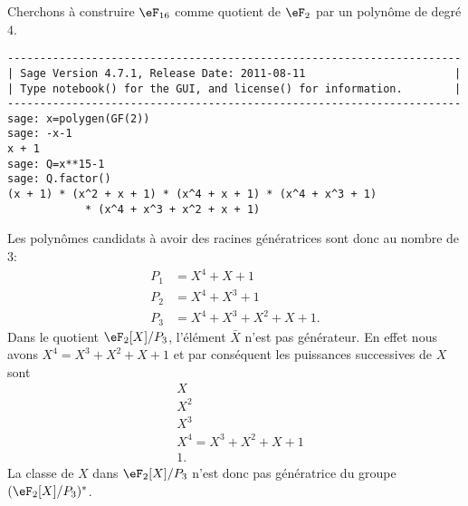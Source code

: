 \begin{example}     \label{ExemWUdrcs}
	Cherchons à construire \( \eF_{16}\) comme quotient de \( \eF_2\) par un polynôme de degré \( 4\).
	\begin{verbatim}
----------------------------------------------------------------------
| Sage Version 4.7.1, Release Date: 2011-08-11                       |
| Type notebook() for the GUI, and license() for information.        |
----------------------------------------------------------------------
sage: x=polygen(GF(2))
sage: -x-1
x + 1
sage: Q=x**15-1
sage: Q.factor()
(x + 1) * (x^2 + x + 1) * (x^4 + x + 1) * (x^4 + x^3 + 1)
            * (x^4 + x^3 + x^2 + x + 1)
    \end{verbatim}
	Les polynômes candidats à avoir des racines génératrices sont donc au nombre de \( 3\):
	\begin{subequations}
		\begin{align}
			P_1 & =X^4+X+1          \\
			P_2 & =X^4+X^3+1        \\
			P_3 & =X^4+X^3+X^2+X+1.
		\end{align}
	\end{subequations}
	Dans le quotient \( \eF_2[X]/P_3\), l'élément \( \bar X\) n'est pas générateur. En effet nous avons \( X^4=X^3+X^2+X+1\) et par conséquent les puissances successives de \( X\) sont
	\begin{subequations}
		\begin{align}
			 & X                 \\
			 & X^2               \\
			 & X^3               \\
			 & X^4  =X^3+X^2+X+1 \\
			 & 1.
		\end{align}
	\end{subequations}
	La classe de \( X\) dans \( \eF_2[X]/P_3\) n'est donc pas génératrice du groupe \( (\eF_2[X]/P_3)^*\).


\end{example}

